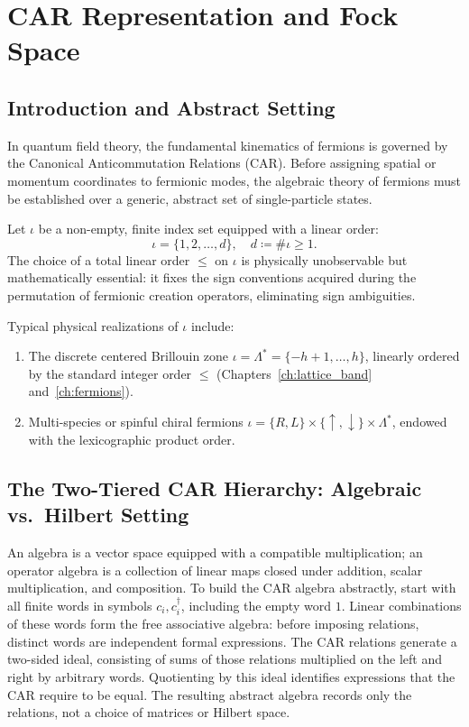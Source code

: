 \chapter{CAR Representation and Fock Space}
\label{ch:car_fock}

\section{Introduction and Abstract Setting}

In quantum field theory, the fundamental kinematics of fermions is governed by the Canonical Anticommutation Relations (CAR). Before assigning spatial or momentum coordinates to fermionic modes, the algebraic theory of fermions must be established over a generic, abstract set of single-particle states.

Let $\iota$ be a non-empty, finite index set equipped with a linear order:
\begin{equation}
\iota = \{1, 2, \dots, d\}, \quad d \coloneqq \#\iota \ge 1.
\end{equation}
The choice of a total linear order $\le$ on $\iota$ is physically unobservable but mathematically essential: it fixes the sign conventions acquired during the permutation of fermionic creation operators, eliminating sign ambiguities.

Typical physical realizations of $\iota$ include:
\begin{enumerate}
    \item The discrete centered Brillouin zone $\iota = \Lambda^* = \{-h+1, \dots, h\}$, linearly ordered by the standard integer order $\le$ (Chapters~\ref{ch:lattice_band} and~\ref{ch:fermions}).
    \item Multi-species or spinful chiral fermions $\iota = \{R, L\} \times \{\uparrow, \downarrow\} \times \Lambda^*$, endowed with the lexicographic product order.
\end{enumerate}

\section{The Two-Tiered CAR Hierarchy: Algebraic vs.\ Hilbert Setting}

An algebra is a vector space equipped with a compatible multiplication; an operator algebra is a collection of linear maps closed under addition, scalar multiplication, and composition. To build the CAR algebra abstractly, start with all finite words in symbols $c_i,c_i^\dagger$, including the empty word $1$. Linear combinations of these words form the free associative algebra: before imposing relations, distinct words are independent formal expressions. The CAR relations generate a two-sided ideal, consisting of sums of those relations multiplied on the left and right by arbitrary words. Quotienting by this ideal identifies expressions that the CAR require to be equal. The resulting abstract algebra records only the relations, not a choice of matrices or Hilbert space.

